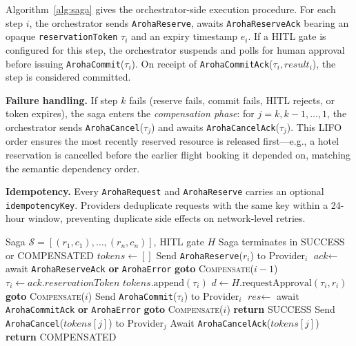 \documentclass[conference]{IEEEtran}
\newcommand{\Saga}{\mathcal{S}}
\begin{document}
Algorithm~\ref{alg:saga} gives the orchestrator-side execution
procedure.  For each step $i$, the orchestrator sends
\texttt{ArohaReserve}, awaits \texttt{ArohaReserveAck} bearing an
opaque \texttt{reservationToken} $\tau_i$ and an expiry timestamp
$e_i$.  If a HITL gate is configured for this step, the orchestrator
suspends and polls for human approval before issuing
\texttt{ArohaCommit}($\tau_i$).  On receipt of
\texttt{ArohaCommitAck}($\tau_i, \textit{result}_i$), the step is
considered committed.

\textbf{Failure handling.}  If step $k$ fails (reserve fails, commit
fails, HITL rejects, or token expires), the saga enters the
\emph{compensation phase}: for $j = k, k-1, \ldots, 1$, the
orchestrator sends \texttt{ArohaCancel}($\tau_j$) and awaits
\texttt{ArohaCancelAck}($\tau_j$).  This LIFO order ensures
the most recently reserved resource is released first—e.g., a hotel
reservation is cancelled before the earlier flight booking it depended
on, matching the semantic dependency order.

\textbf{Idempotency.}  Every \texttt{ArohaRequest} and
\texttt{ArohaReserve} carries an optional \texttt{idempotencyKey}.
Providers deduplicate requests with the same key within a 24-hour
window, preventing duplicate side effects on network-level retries.

\begin{algorithm}[t]
\caption{Aroha Saga Execution (Orchestrator)}
\label{alg:saga}
{\small
\begin{algorithmic}[1]
\Require Saga $\Saga = [(r_1,c_1),\ldots,(r_n,c_n)]$, HITL gate $H$
\Ensure Saga terminates in SUCCESS or COMPENSATED
\State $\textit{tokens} \gets []$
  \State Send \texttt{ArohaReserve}($r_i$) to Provider$_i$
  \State $\textit{ack} \gets $ await \texttt{ArohaReserveAck} \textbf{or} \texttt{ArohaError}
    \State \textbf{goto} \textsc{Compensate}($i-1$)
  \EndIf
  \State $\tau_i \gets \textit{ack.reservationToken}$
  \State $\textit{tokens}.\text{append}(\tau_i)$
    \State $d \gets H.\text{requestApproval}(\tau_i, r_i)$
      \State \textbf{goto} \textsc{Compensate}($i$)
    \EndIf
  \EndIf
  \State Send \texttt{ArohaCommit}($\tau_i$) to Provider$_i$
  \State $\textit{res} \gets $ await \texttt{ArohaCommitAck} \textbf{or} \texttt{ArohaError}
    \State \textbf{goto} \textsc{Compensate}($i$)
  \EndIf
\EndFor
\State \textbf{return} SUCCESS
\State
{}
    \State Send \texttt{ArohaCancel}($\textit{tokens}[j]$) to Provider$_j$
    \State Await \texttt{ArohaCancelAck}($\textit{tokens}[j]$)
  \EndFor
  \State \textbf{return} COMPENSATED
\EndFunction
\end{algorithmic}
}
\end{algorithm}
\end{document}
